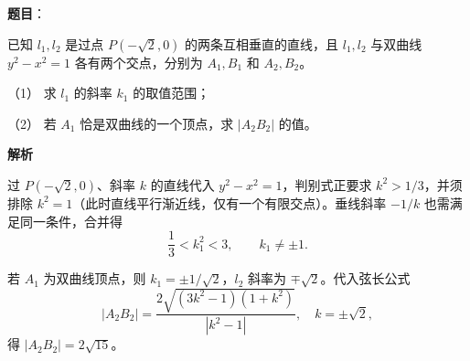 \begin{answer}

\textbf{题目}：

已知 $l_1,l_2$ 是过点 $P(-\sqrt{2},0)$ 的两条互相垂直的直线，且 $l_1,l_2$ 与双曲线 $y^2-x^2=1$ 各有两个交点，分别为 $A_1,B_1$ 和 $A_2,B_2$。

（1） 求 $l_1$ 的斜率 $k_1$ 的取值范围；

（2） 若 $A_1$ 恰是双曲线的一个顶点，求 $|A_2B_2|$ 的值。

\textbf{解析}


过 $P(-\sqrt2,0)$、斜率 $k$ 的直线代入 $y^2-x^2=1$，判别式正要求 $k^2>1/3$，并须排除 $k^2=1$（此时直线平行渐近线，仅有一个有限交点）。垂线斜率 $-1/k$ 也需满足同一条件，合并得
\nopagebreak[4]
\[
\frac13<k_1^2<3,\qquad k_1\ne\pm1.
\]


若 $A_1$ 为双曲线顶点，则 $k_1=\pm1/\sqrt2$，$l_2$ 斜率为 $\mp\sqrt2$。代入弦长公式
\nopagebreak[4]
\[
|A_2B_2|=\frac{2\sqrt{(3k^2-1)(1+k^2)}}{|k^2-1|},\quad k=\pm\sqrt2,
\]
得 $|A_2B_2|=2\sqrt{15}$。



\end{answer}